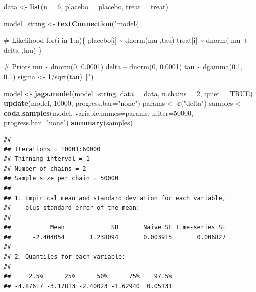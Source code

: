 \documentclass[
]{article}
\newenvironment{Shaded}{\begin{snugshade}}{\end{snugshade}}
\newcommand{\AttributeTok}[1]{\textcolor[rgb]{0.13,0.29,0.53}{#1}}
\newcommand{\ConstantTok}[1]{\textcolor[rgb]{0.56,0.35,0.01}{#1}}
\newcommand{\DecValTok}[1]{\textcolor[rgb]{0.00,0.00,0.81}{#1}}
\newcommand{\FunctionTok}[1]{\textcolor[rgb]{0.13,0.29,0.53}{\textbf{#1}}}
\newcommand{\NormalTok}[1]{#1}
\newcommand{\OtherTok}[1]{\textcolor[rgb]{0.56,0.35,0.01}{#1}}
\newcommand{\StringTok}[1]{\textcolor[rgb]{0.31,0.60,0.02}{#1}}
\begin{document}
\begin{Shaded}
\begin{Highlighting}[]
\NormalTok{  data }\OtherTok{\textless{}{-}} \FunctionTok{list}\NormalTok{(}\AttributeTok{n =} \DecValTok{6}\NormalTok{, }\AttributeTok{placebo =}\NormalTok{ placebo, }\AttributeTok{treat =}\NormalTok{ treat)}

\NormalTok{  model\_string }\OtherTok{\textless{}{-}} \FunctionTok{textConnection}\NormalTok{(}\StringTok{"model\{}

\StringTok{   \# Likelihood}
\StringTok{   for(i in 1:n)\{}
\StringTok{     placebo[i] \textasciitilde{} dnorm(mu ,tau)}
\StringTok{     treat[i] \textasciitilde{} dnorm( mu + delta ,tau)}
\StringTok{   \}}

\StringTok{   \# Priors}
\StringTok{   mu    \textasciitilde{}  dnorm(0, 0.0001)}
\StringTok{   delta \textasciitilde{}  dnorm(0, 0.0001)}
\StringTok{   tau   \textasciitilde{}  dgamma(0.1, 0.1)}
\StringTok{   sigma \textless{}{-} 1/sqrt(tau)}
\StringTok{ \}"}\NormalTok{)}

\NormalTok{ model }\OtherTok{\textless{}{-}} \FunctionTok{jags.model}\NormalTok{(model\_string, }\AttributeTok{data =}\NormalTok{ data, }\AttributeTok{n.chains =} \DecValTok{2}\NormalTok{, }\AttributeTok{quiet =} \ConstantTok{TRUE}\NormalTok{)}
 \FunctionTok{update}\NormalTok{(model, }\DecValTok{10000}\NormalTok{, }\AttributeTok{progress.bar=}\StringTok{"none"}\NormalTok{)}
\NormalTok{ params  }\OtherTok{\textless{}{-}} \FunctionTok{c}\NormalTok{(}\StringTok{"delta"}\NormalTok{)}
\NormalTok{ samples }\OtherTok{\textless{}{-}} \FunctionTok{coda.samples}\NormalTok{(model, }
            \AttributeTok{variable.names=}\NormalTok{params, }
            \AttributeTok{n.iter=}\DecValTok{50000}\NormalTok{, }\AttributeTok{progress.bar=}\StringTok{"none"}\NormalTok{)}
 \FunctionTok{summary}\NormalTok{(samples)}
\end{Highlighting}
\end{Shaded}

\begin{verbatim}
## 
## Iterations = 10001:60000
## Thinning interval = 1 
## Number of chains = 2 
## Sample size per chain = 50000 
## 
## 1. Empirical mean and standard deviation for each variable,
##    plus standard error of the mean:
## 
##           Mean             SD       Naive SE Time-series SE 
##      -2.404054       1.238094       0.003915       0.006827 
## 
## 2. Quantiles for each variable:
## 
##     2.5%      25%      50%      75%    97.5% 
## -4.87617 -3.17813 -2.40023 -1.62940  0.05131
\end{verbatim}
\end{document}
